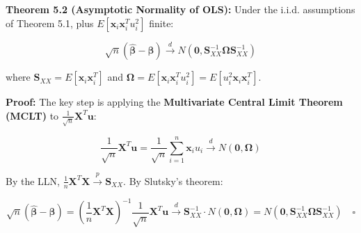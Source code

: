 \textbf{Theorem 5.2 (Asymptotic Normality of OLS):} Under the i.i.d. assumptions of Theorem 5.1, plus $E[\mathbf{x}_i \mathbf{x}_i^T u_i^2]$ finite:

\[
\sqrt{n}(\hat{\boldsymbol{\beta}} - \boldsymbol{\beta}) \xrightarrow{d} N\!\left(\mathbf{0}, \mathbf{S}_{XX}^{-1} \boldsymbol{\Omega} \mathbf{S}_{XX}^{-1}\right)
\]

where $\mathbf{S}_{XX} = E[\mathbf{x}_i \mathbf{x}_i^T]$ and $\boldsymbol{\Omega} = E[\mathbf{x}_i \mathbf{x}_i^T u_i^2] = E[u_i^2 \mathbf{x}_i \mathbf{x}_i^T]$.

\textbf{Proof:} The key step is applying the \textbf{Multivariate Central Limit Theorem (MCLT)} to $\frac{1}{\sqrt{n}}\mathbf{X}^T\mathbf{u}$:

\[
\frac{1}{\sqrt{n}}\mathbf{X}^T\mathbf{u} = \frac{1}{\sqrt{n}}\sum_{i=1}^n \mathbf{x}_i u_i \xrightarrow{d} N(\mathbf{0}, \boldsymbol{\Omega})
\]

By the LLN, $\frac{1}{n}\mathbf{X}^T\mathbf{X} \xrightarrow{p} \mathbf{S}_{XX}$. By Slutsky's theorem:

\[
\sqrt{n}(\hat{\boldsymbol{\beta}} - \boldsymbol{\beta}) = \left(\frac{1}{n}\mathbf{X}^T\mathbf{X}\right)^{-1} \frac{1}{\sqrt{n}}\mathbf{X}^T\mathbf{u} \xrightarrow{d} \mathbf{S}_{XX}^{-1} \cdot N(\mathbf{0}, \boldsymbol{\Omega}) = N(\mathbf{0}, \mathbf{S}_{XX}^{-1}\boldsymbol{\Omega}\mathbf{S}_{XX}^{-1}) \quad \square
\]

